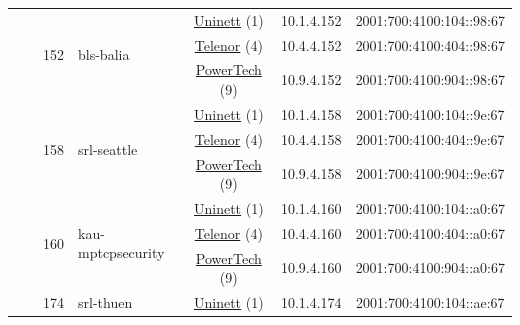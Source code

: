\begin{small}
\begin{center}
\begin{longtable}{|c|c|c|c|c|c|c|c|}
  &  & \multirow{3}{*}{\tiny{152}} & \multicolumn{1}{|l|}{\multirow{3}{*}{\tiny{bls-balia}}} & \multicolumn{2}{|c|}{\tiny{\href{https://www.uninett.no}{Uninett} (1)}} & \tiny{10.1.4.152} & \tiny{2001:700:4100:104::98:67} \\* \cline{5-5}\cline{6-6}\cline{7-7}\cline{8-8}
  &  &  &  & \multicolumn{2}{|c|}{\tiny{\href{https://www.telenor.no}{Telenor} (4)}} & \tiny{10.4.4.152} & \tiny{2001:700:4100:404::98:67} \\* \cline{5-5}\cline{6-6}\cline{7-7}\cline{8-8}
  &  &  &  & \multicolumn{2}{|c|}{\tiny{\href{http://www.powertech.no}{PowerTech} (9)}} & \tiny{10.9.4.152} & \tiny{2001:700:4100:904::98:67} \\* \cline{3-3}\cline{4-4}\cline{5-5}\cline{6-6}\cline{7-7}\cline{8-8}
  &  & \multirow{3}{*}{\tiny{158}} & \multicolumn{1}{|l|}{\multirow{3}{*}{\tiny{srl-seattle}}} & \multicolumn{2}{|c|}{\tiny{\href{https://www.uninett.no}{Uninett} (1)}} & \tiny{10.1.4.158} & \tiny{2001:700:4100:104::9e:67} \\* \cline{5-5}\cline{6-6}\cline{7-7}\cline{8-8}
  &  &  &  & \multicolumn{2}{|c|}{\tiny{\href{https://www.telenor.no}{Telenor} (4)}} & \tiny{10.4.4.158} & \tiny{2001:700:4100:404::9e:67} \\* \cline{5-5}\cline{6-6}\cline{7-7}\cline{8-8}
  &  &  &  & \multicolumn{2}{|c|}{\tiny{\href{http://www.powertech.no}{PowerTech} (9)}} & \tiny{10.9.4.158} & \tiny{2001:700:4100:904::9e:67} \\* \cline{3-3}\cline{4-4}\cline{5-5}\cline{6-6}\cline{7-7}\cline{8-8}
  &  & \multirow{3}{*}{\tiny{160}} & \multicolumn{1}{|l|}{\multirow{3}{*}{\tiny{kau-mptcpsecurity}}} & \multicolumn{2}{|c|}{\tiny{\href{https://www.uninett.no}{Uninett} (1)}} & \tiny{10.1.4.160} & \tiny{2001:700:4100:104::a0:67} \\* \cline{5-5}\cline{6-6}\cline{7-7}\cline{8-8}
  &  &  &  & \multicolumn{2}{|c|}{\tiny{\href{https://www.telenor.no}{Telenor} (4)}} & \tiny{10.4.4.160} & \tiny{2001:700:4100:404::a0:67} \\* \cline{5-5}\cline{6-6}\cline{7-7}\cline{8-8}
  &  &  &  & \multicolumn{2}{|c|}{\tiny{\href{http://www.powertech.no}{PowerTech} (9)}} & \tiny{10.9.4.160} & \tiny{2001:700:4100:904::a0:67} \\* \cline{3-3}\cline{4-4}\cline{5-5}\cline{6-6}\cline{7-7}\cline{8-8}
  &  & \multirow{3}{*}{\tiny{174}} & \multicolumn{1}{|l|}{\multirow{3}{*}{\tiny{srl-thuen}}} & \multicolumn{2}{|c|}{\tiny{\href{https://www.uninett.no}{Uninett} (1)}} & \tiny{10.1.4.174} & \tiny{2001:700:4100:104::ae:67} \\* \cline{5-5}\cline{6-6}\cline{7-7}\cline{8-8}

\end{longtable}
\end{center}
\end{small}
